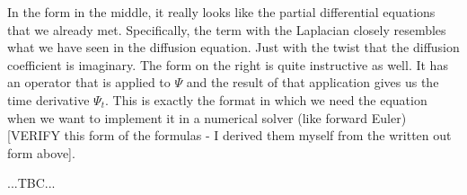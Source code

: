 In the form in the middle, it really looks like the partial differential equations that we already met. Specifically, the term with the Laplacian closely resembles what we have seen in the diffusion equation. Just with the twist that the diffusion coefficient is imaginary. The form on the right is quite instructive as well. It has an operator that is applied to $\Psi$ and the result of that application gives us the time derivative $\Psi_t$. This is exactly the format in which we need the equation when we want to implement it in a numerical solver (like forward Euler) [VERIFY this form of the formulas - I derived them myself from the written out form above].





...TBC...


